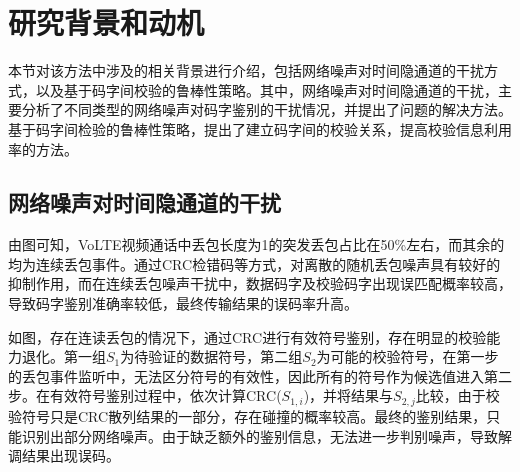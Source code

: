 \section{研究背景和动机}
\label{chap:hash:motivation}

本节对该方法中涉及的相关背景进行介绍，包括网络噪声对时间隐通道的干扰方式，以及基于码字间校验的鲁棒性策略。其中，网络噪声对时间隐通道的干扰，主要分析了不同类型的网络噪声对码字鉴别的干扰情况，并提出了问题的解决方法。基于码字间检验的鲁棒性策略，提出了建立码字间的校验关系，提高校验信息利用率的方法。

\subsection{网络噪声对时间隐通道的干扰}
\label{chap:hash:motivation:noise}

由图可知，VoLTE视频通话中丢包长度为1的突发丢包占比在50\%左右，而其余的均为连续丢包事件。通过CRC检错码等方式，对离散的随机丢包噪声具有较好的抑制作用，而在连续丢包噪声干扰中，数据码字及校验码字出现误匹配概率较高，导致码字鉴别准确率较低，最终传输结果的误码率升高。


如图，存在连读丢包的情况下，通过CRC进行有效符号鉴别，存在明显的校验能力退化。第一组$S_{1}$为待验证的数据符号，第二组$S_{2}$为可能的校验符号，在第一步的丢包事件监听中，无法区分符号的有效性，因此所有的符号作为候选值进入第二步。在有效符号鉴别过程中，依次计算CRC($S_{1,i}$)，并将结果与$S_{2,j}$比较，由于校验符号只是CRC散列结果的一部分，存在碰撞的概率较高。最终的鉴别结果，只能识别出部分网络噪声。由于缺乏额外的鉴别信息，无法进一步判别噪声，导致解调结果出现误码。

